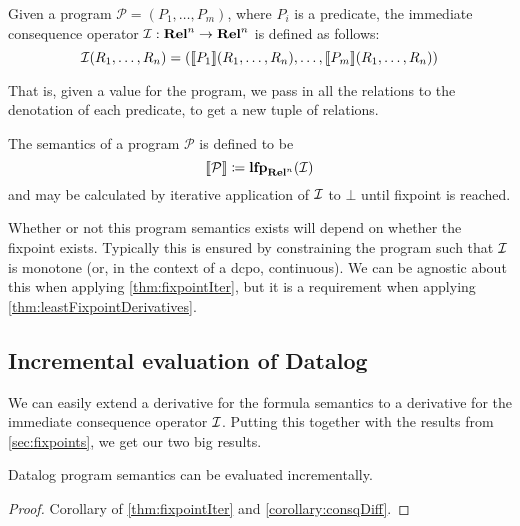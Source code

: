 \begin{defn}
  Given a program $\mathcal{P} = (P_1, \dots, P_m)$, where $P_i$ is a predicate,
  the immediate consequence operator $\mathcal{I}: \mathbf{Rel}^n \rightarrow \mathbf{Rel}^n$ is defined as follows:
  \begin{displaymath}
    \mathcal{I}(R_1, \dots, R_n) = (\llbracket P_1 \rrbracket(R_1, \dots, R_n), \dots, \llbracket P_m \rrbracket(R_1, \dots, R_n))
  \end{displaymath}
\end{defn}

That is, given a value for the program, we pass in all the relations
to the denotation of each predicate, to get a new tuple of relations.

\begin{defn}
  The semantics of a program $\mathcal{P}$ is defined to be
  \begin{displaymath}
    \llbracket \mathcal{P} \rrbracket \coloneqq \mathbf{lfp}_{\mathbf{Rel}^n}(\mathcal{I})
  \end{displaymath}
  and may be calculated by iterative application of $\mathcal{I}$ to $\bot$ until
  fixpoint is reached.
\end{defn}

Whether or not this program semantics exists will depend on whether the fixpoint
exists. Typically this is ensured by constraining the program such that $\mathcal{I}$
is monotone (or, in the context of a dcpo, continuous). We can be agnostic
about this when applying \cref{thm:fixpointIter}, but it is a requirement when
applying \cref{thm:leastFixpointDerivatives}.

\subsection{Incremental evaluation of Datalog}
\label{sec:datalogIncr}

We can easily extend a derivative for the formula semantics to a derivative for
the immediate consequence operator $\mathcal{I}$. Putting this together with the
results from \cref{sec:fixpoints}, we get our two big results.

\begin{thm}
\label{thm:diffEval}
  Datalog program semantics can be evaluated incrementally.
\end{thm}
\ifproofs
\begin{proof}
  Corollary of \cref{thm:fixpointIter} and \cref{corollary:consqDiff}.
\end{proof}
\fi

